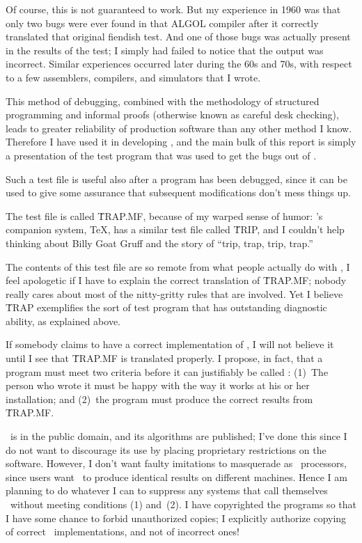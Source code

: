 Of course, this is not guaranteed to work. But my experience in 1960 was
that only two bugs were ever found in that {\mc ALGOL} compiler after it
correctly translated that original fiendish test. And one of those bugs
was actually present in the results of the test; I simply had failed to
notice that the output was incorrect. Similar experiences occurred later
during the 60s and 70s, with respect to a few assemblers, compilers,
and simulators that I wrote.

This method of debugging, combined with the methodology of structured
programming and informal proofs (otherwise known as careful desk checking),
leads to greater reliability of production software than any other
method I know. Therefore I have used it in developing , and the
main bulk of this report is simply a presentation of the test program
that was used to get the bugs out of \MF.

Such a test file is useful also after a program has been debugged, since
it can be used to give some assurance that subsequent modifications don't
mess things up.

The test file is called \.{TRAP.MF}, because of my warped sense of humor:
\MF's companion system, \TeX, has a similar test file called \.{TRIP}, and I
couldn't help thinking about Billy Goat Gruff and the story of ``trip,
trap, trip, trap.''

The contents of this test file are so remote from what people actually
do with \MF, I feel apologetic if I have to explain the correct
translation of \.{TRAP.MF}; nobody really cares about most of the
nitty-gritty rules that are involved. Yet I believe \.{TRAP} exemplifies
the sort of test program that has outstanding diagnostic ability, as
explained above.

If somebody claims to have a correct implementation of \MF, I will not
believe it until I see that \.{TRAP.MF} is translated properly.
I propose, in fact, that a program must meet two criteria before it
can justifiably be called \MF: (1)~The person who wrote it must be
happy with the way it works at his or her installation; and (2)~the
program must produce the correct results from \.{TRAP.MF}.

\MF\ is in the public domain, and its algorithms are published;
I've done this since I do not want to discourage its use by placing
proprietary restrictions on the software. However, I don't want
faulty imitations to masquerade as \MF\ processors, since users
want \MF\ to produce identical results on different machines.
Hence I am planning to do whatever I can to suppress any systems that
call themselves \MF\ without meeting conditions (1) and~(2).
I have copyrighted the programs so that I have some chance to forbid
unauthorized copies; I explicitly authorize copying of correct
\MF\ implementations, and not of incorrect ones!

